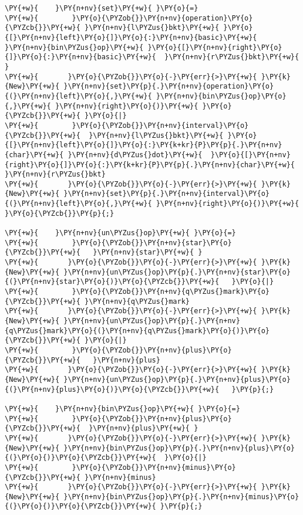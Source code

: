 \begin{Verbatim}[commandchars=\\\{\}]
\PY{+w}{    }\PY{n+nv}{set}\PY{+w}{ }\PY{o}{=}
\PY{+w}{        }\PY{o}{\PYZob{}}\PY{n+nv}{operation}\PY{o}{\PYZcb{}}\PY{+w}{ }\PY{n+nv}{l\PYZus{}bkt}\PY{+w}{ }\PY{o}{[}\PY{n+nv}{left}\PY{o}{]}\PY{o}{:}\PY{n+nv}{basic}\PY{+w}{  }\PY{n+nv}{bin\PYZus{}op}\PY{+w}{ }\PY{o}{[}\PY{n+nv}{right}\PY{o}{]}\PY{o}{:}\PY{n+nv}{basic}\PY{+w}{  }\PY{n+nv}{r\PYZus{}bkt}\PY{+w}{ }
\PY{+w}{	   }\PY{o}{\PYZob{}}\PY{o}{-}\PY{err}{>}\PY{+w}{ }\PY{k}{New}\PY{+w}{ }\PY{n+nv}{set}\PY{p}{.}\PY{n+nv}{operation}\PY{o}{(}\PY{n+nv}{left}\PY{o}{,}\PY{+w}{ }\PY{n+nv}{bin\PYZus{}op}\PY{o}{,}\PY{+w}{ }\PY{n+nv}{right}\PY{o}{)}\PY{+w}{ }\PY{o}{\PYZcb{}}\PY{+w}{ }\PY{o}{|}
\PY{+w}{        }\PY{o}{\PYZob{}}\PY{n+nv}{interval}\PY{o}{\PYZcb{}}\PY{+w}{  }\PY{n+nv}{l\PYZus{}bkt}\PY{+w}{ }\PY{o}{[}\PY{n+nv}{left}\PY{o}{]}\PY{o}{:}\PY{k+kr}{P}\PY{p}{.}\PY{n+nv}{char}\PY{+w}{ }\PY{n+nv}{d\PYZus{}dot}\PY{+w}{  }\PY{o}{[}\PY{n+nv}{right}\PY{o}{]}\PY{o}{:}\PY{k+kr}{P}\PY{p}{.}\PY{n+nv}{char}\PY{+w}{ }\PY{n+nv}{r\PYZus{}bkt}
\PY{+w}{	   }\PY{o}{\PYZob{}}\PY{o}{-}\PY{err}{>}\PY{+w}{ }\PY{k}{New}\PY{+w}{ }\PY{n+nv}{set}\PY{p}{.}\PY{n+nv}{interval}\PY{o}{(}\PY{n+nv}{left}\PY{o}{,}\PY{+w}{ }\PY{n+nv}{right}\PY{o}{)}\PY{+w}{ }\PY{o}{\PYZcb{}}\PY{p}{;}

\PY{+w}{    }\PY{n+nv}{un\PYZus{}op}\PY{+w}{ }\PY{o}{=}
\PY{+w}{        }\PY{o}{\PYZob{}}\PY{n+nv}{star}\PY{o}{\PYZcb{}}\PY{+w}{   }\PY{n+nv}{star}\PY{+w}{ }
\PY{+w}{	   }\PY{o}{\PYZob{}}\PY{o}{-}\PY{err}{>}\PY{+w}{ }\PY{k}{New}\PY{+w}{ }\PY{n+nv}{un\PYZus{}op}\PY{p}{.}\PY{n+nv}{star}\PY{o}{(}\PY{n+nv}{star}\PY{o}{)}\PY{o}{\PYZcb{}}\PY{+w}{   }\PY{o}{|}
\PY{+w}{        }\PY{o}{\PYZob{}}\PY{n+nv}{q\PYZus{}mark}\PY{o}{\PYZcb{}}\PY{+w}{ }\PY{n+nv}{q\PYZus{}mark}
\PY{+w}{	   }\PY{o}{\PYZob{}}\PY{o}{-}\PY{err}{>}\PY{+w}{ }\PY{k}{New}\PY{+w}{ }\PY{n+nv}{un\PYZus{}op}\PY{p}{.}\PY{n+nv}{q\PYZus{}mark}\PY{o}{(}\PY{n+nv}{q\PYZus{}mark}\PY{o}{)}\PY{o}{\PYZcb{}}\PY{+w}{ }\PY{o}{|}
\PY{+w}{        }\PY{o}{\PYZob{}}\PY{n+nv}{plus}\PY{o}{\PYZcb{}}\PY{+w}{   }\PY{n+nv}{plus}
\PY{+w}{	   }\PY{o}{\PYZob{}}\PY{o}{-}\PY{err}{>}\PY{+w}{ }\PY{k}{New}\PY{+w}{ }\PY{n+nv}{un\PYZus{}op}\PY{p}{.}\PY{n+nv}{plus}\PY{o}{(}\PY{n+nv}{plus}\PY{o}{)}\PY{o}{\PYZcb{}}\PY{+w}{   }\PY{p}{;}

\PY{+w}{    }\PY{n+nv}{bin\PYZus{}op}\PY{+w}{ }\PY{o}{=}
\PY{+w}{        }\PY{o}{\PYZob{}}\PY{n+nv}{plus}\PY{o}{\PYZcb{}}\PY{+w}{  }\PY{n+nv}{plus}\PY{+w}{ }
\PY{+w}{	   }\PY{o}{\PYZob{}}\PY{o}{-}\PY{err}{>}\PY{+w}{ }\PY{k}{New}\PY{+w}{ }\PY{n+nv}{bin\PYZus{}op}\PY{p}{.}\PY{n+nv}{plus}\PY{o}{(}\PY{o}{)}\PY{o}{\PYZcb{}}\PY{+w}{  }\PY{o}{|}
\PY{+w}{        }\PY{o}{\PYZob{}}\PY{n+nv}{minus}\PY{o}{\PYZcb{}}\PY{+w}{ }\PY{n+nv}{minus}
\PY{+w}{	   }\PY{o}{\PYZob{}}\PY{o}{-}\PY{err}{>}\PY{+w}{ }\PY{k}{New}\PY{+w}{ }\PY{n+nv}{bin\PYZus{}op}\PY{p}{.}\PY{n+nv}{minus}\PY{o}{(}\PY{o}{)}\PY{o}{\PYZcb{}}\PY{+w}{ }\PY{p}{;}


\end{Verbatim}
